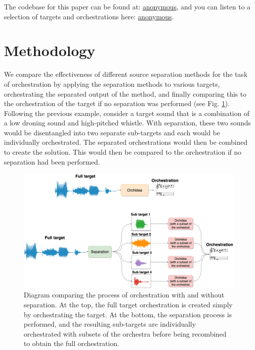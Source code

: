 \documentclass{article}
\begin{document}
  The codebase for this paper can be found at: \url{anonymous}, and you can listen to a selection of targets and orchestrations here: \url{anonymous}.
    
  
  \section{Methodology}\label{sec:methodology}
  
  We compare the effectiveness of different source separation methods for the task of orchestration by applying the separation methods to various targets, orchestrating the separated output of the method, and finally comparing this to the orchestration of the target if no separation was performed (see Fig. \ref{fig:full_diagram}). Following the previous example, consider a target sound that is a combination of a low droning sound and high-pitched whistle. With separation, these two sounds would be disentangled into two separate sub-targets and each would be individually orchestrated. The separated orchestrations would then be combined to create the solution. This would then be compared to the orchestration if no separation had been performed.
  
  \begin{figure}[t]
    \centering
      \includegraphics[width=\textwidth]{figures/diagram.png}
      \caption{Diagram comparing the process of orchestration with and without separation. At the top, the full target orchestration is created simply by orchestrating the target. At the bottom, the separation process is performed, and the resulting sub-targets are individually orchestrated with subsets of the orchestra before being recombined to obtain the full orchestration.}\label{fig:full_diagram}
  \end{figure}
\end{document}

